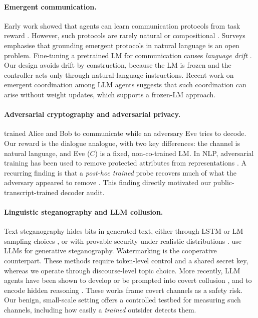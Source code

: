 \documentclass[10pt,a4paper,twocolumn]{article}
\newcommand{\1}{\mathbb{1}}
\begin{document}
\paragraph{Emergent communication.}
Early work showed that agents can learn communication protocols from task reward \citep{foerster2016learning,lazaridou2017multiagent,havrylov2017emergence}. However, such protocols are rarely natural or compositional \citep{kottur2017natural,chaabouni2020compositionality}. Surveys \citep{lazaridou2020emergent,baroni2022tutorial} emphasise that grounding emergent protocols in natural language is an open problem. Fine-tuning a pretrained LM for communication causes \emph{language drift} \citep{lee2019countering,lu2020seeded}. Our design avoids drift by construction, because the LM is frozen and the controller acts only through natural-language instructions. Recent work on emergent coordination among LLM agents \citep{riedl2025emergent} suggests that such coordination can arise without weight updates, which supports a frozen-LM approach.

\paragraph{Adversarial cryptography and adversarial privacy.}
\citet{abadi2016learning} trained Alice and Bob to communicate while an adversary Eve tries to decode. Our reward is the dialogue analogue, with two key differences: the channel is natural language, and Eve ($C$) is a fixed, non-co-trained LM. In NLP, adversarial training has been used to remove protected attributes from representations \citep{ganin2016domain,elazar2018adversarial,coavoux2018privacy}. A recurring finding is that a \emph{post-hoc trained} probe recovers much of what the adversary appeared to remove \citep{elazar2018adversarial}. This finding directly motivated our public-transcript-trained decoder audit.

\paragraph{Linguistic steganography and LLM collusion.}
Text steganography hides bits in generated text, either through LSTM or LM sampling choices \citep{fang2017generating,ziegler2019neural,dai2019towards}, or with provable security under realistic distributions \citep{kaptchuk2021meteor}. \citet{wu2024generative} use LLMs for generative steganography. Watermarking \citep{kirchenbauer2023watermark} is the cooperative counterpart. These methods require token-level control and a shared secret key, whereas we operate through discourse-level topic choice. More recently, LLM agents have been shown to develop or be prompted into covert collusion \citep{motwani2024secret,mathew2024hidden}, and to encode hidden reasoning \citep{roger2023preventing}. These works frame covert channels as a safety risk. Our benign, small-scale setting offers a controlled testbed for measuring such channels, including how easily a \emph{trained} outsider detects them.
\end{document}
